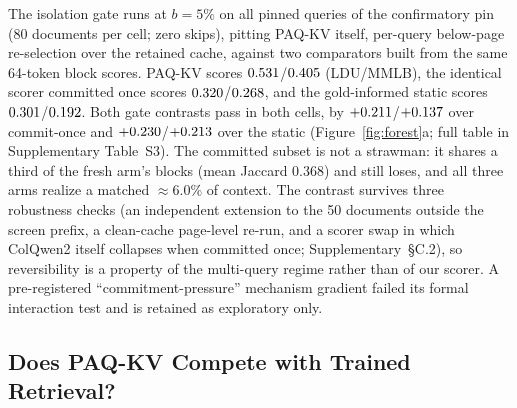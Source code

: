 \documentclass[letterpaper]{article} %
\newcommand{\paqc}{\textsc{PAQ-KV}}
\begin{document}
The isolation gate runs at $b=5\%$ on all \isoKVNComplete{} pinned queries of
the confirmatory pin (80 documents per cell; zero skips), pitting \paqc{}
itself, per-query below-page re-selection over the retained cache, against
two comparators built from the same 64-token block scores. \paqc{} scores
$0.531$/$0.405$ (LDU/MMLB), the identical
scorer committed once scores $0.320$/$0.268$, and
the gold-informed static scores $0.301$/$0.192$.
Both gate contrasts pass in both cells, by
$+0.211$/$+0.137$ over commit-once and
$+0.230$/$+0.213$ over the static
(Figure~\ref{fig:forest}a; full table in Supplementary Table~S3).
The committed subset is not a strawman: it shares a third of the fresh arm's
blocks (mean Jaccard $0.368$) and still loses, and all three arms realize a
matched ${\approx}6.0\%$ of context. The contrast survives three robustness
checks (an independent extension to the 50 documents outside the screen
prefix, a clean-cache page-level re-run, and a scorer swap in which ColQwen2
itself collapses when committed once; Supplementary~\S C.2), so
reversibility is a property of the multi-query regime rather than of our
scorer. A pre-registered ``commitment-pressure'' mechanism gradient failed
its formal interaction test and is retained as exploratory only.

\subsection{Does \paqc{} Compete with Trained Retrieval?}\label{sec:results-mmlo}
\end{document}
